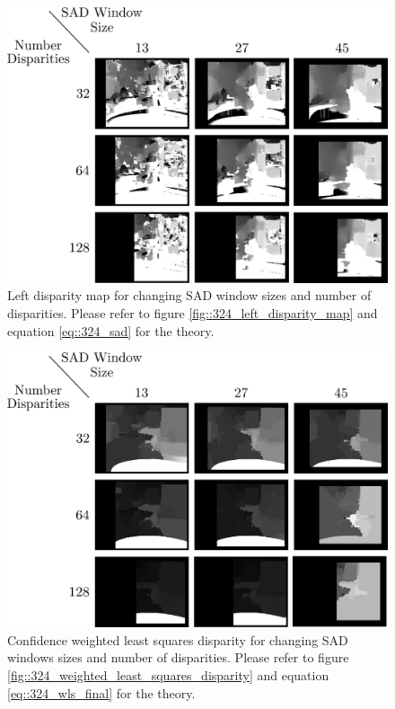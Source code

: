 \begin{figure}[h]
	\centering
	\includegraphics[scale=.25]{chapters/05_experiments/02_depth_map_parameter_tuning/disp_sad.png}
	\caption{Left disparity map for changing SAD window sizes and number of disparities. Please refer to figure \ref{fig::324_left_disparity_map} and equation \ref{eq::324_sad} for the theory.}
	\label{fig::52_disp_sad}
\end{figure}
\begin{figure}[h]
	\centering
	\includegraphics[scale=.25]{chapters/05_experiments/02_depth_map_parameter_tuning/disp_sad_wls.png}
	\caption{Confidence weighted least squares disparity for changing SAD windows sizes and number of disparities. Please refer to figure \ref{fig::324_weighted_least_squares_disparity} and equation \ref{eq::324_wls_final} for the theory.}
	\label{fig::52_disp_sad_wls}
\end{figure}
